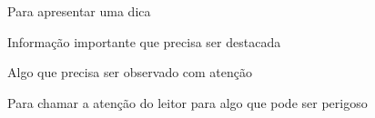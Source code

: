 \documentclass[11pt]{../classes/ifscarticle}
\begin{document}
\begin{tip}
	Para apresentar uma dica 
\end{tip}

\begin{important}
	Informação importante que precisa ser destacada
\end{important}

\begin{warning}
	Algo que precisa ser observado com atenção
\end{warning}

\begin{caution}
	Para chamar a atenção do leitor para algo que pode ser perigoso
\end{caution}


\vspace*{\fill}
\licenciamentoLivre
\end{document}
